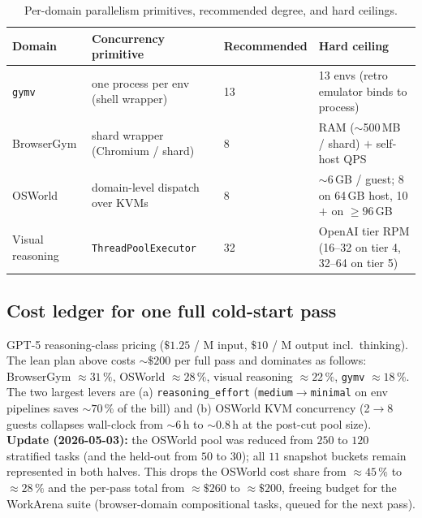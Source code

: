 \begin{table}[t]
\centering
\small
\caption{Per-domain parallelism primitives, recommended degree, and
hard ceilings.}
\label{tab:bench-parallel}
\renewcommand{\arraystretch}{1.10}
\begin{tabular}{@{}llll@{}}
\toprule
\textbf{Domain}   & \textbf{Concurrency primitive}      & \textbf{Recommended} & \textbf{Hard ceiling} \\
\midrule
\texttt{gymv}     & one process per env (shell wrapper) & 13                   & 13 envs (retro emulator binds to process) \\
BrowserGym        & shard wrapper (Chromium / shard)    & 8                    & RAM ($\sim$500\,MB / shard) $+$ self-host QPS \\
OSWorld           & domain-level dispatch over KVMs     & 8                    & $\sim$6\,GB / guest; 8 on 64\,GB host, 10$+$ on $\geq\!96$\,GB \\
Visual reasoning  & \texttt{ThreadPoolExecutor}         & 32                   & OpenAI tier RPM (16--32 on tier 4, 32--64 on tier 5) \\
\bottomrule
\end{tabular}
\end{table}

\subsection{Cost ledger for one full cold-start pass}
\label{app:bench-cost}

GPT-5 reasoning-class pricing ($\$1.25$ / M input, $\$10$ / M output
incl.\ thinking). The lean plan above costs $\sim$$\$200$ per full pass
and dominates as follows: BrowserGym $\approx\!31\,\%$, OSWorld
$\approx\!28\,\%$, visual reasoning $\approx\!22\,\%$,
\texttt{gymv} $\approx\!18\,\%$. The two largest levers are
(a) \texttt{reasoning\_effort} (\texttt{medium}$\!\to\!$\texttt{minimal}
on env pipelines saves $\sim\!70\,\%$ of the bill) and (b) OSWorld KVM
concurrency (2$\!\to\!$8 guests collapses wall-clock from
$\sim\!6$\,h to $\sim\!0.8$\,h at the post-cut pool size).
\textbf{Update (2026-05-03):} the OSWorld pool was reduced from $250$
to $120$ stratified tasks (and the held-out from $50$ to $30$); all
$11$ snapshot buckets remain represented in both halves. This drops
the OSWorld cost share from $\approx\!45\,\%$ to $\approx\!28\,\%$
and the per-pass total from $\approx\!\$260$ to $\approx\!\$200$,
freeing budget for the WorkArena suite (browser-domain compositional
tasks, queued for the next pass).

